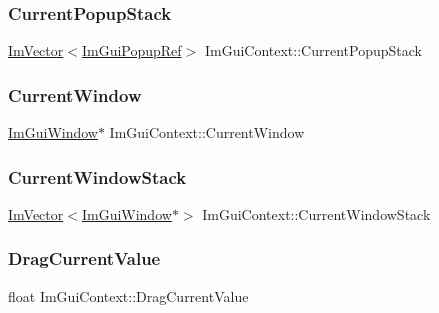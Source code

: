 \hypertarget{struct_im_gui_context_a7b2472ca52bcccb98e0db1a8b1b78853}{}\label{struct_im_gui_context_a7b2472ca52bcccb98e0db1a8b1b78853} 
\subsubsection{\texorpdfstring{Current\+Popup\+Stack}{CurrentPopupStack}}
{\footnotesize\ttfamily \hyperlink{class_im_vector}{Im\+Vector}$<$\hyperlink{struct_im_gui_popup_ref}{Im\+Gui\+Popup\+Ref}$>$ Im\+Gui\+Context\+::\+Current\+Popup\+Stack}

\hypertarget{struct_im_gui_context_aa923044f396241668aef5ed2f4c4d847}{}\label{struct_im_gui_context_aa923044f396241668aef5ed2f4c4d847} 
\subsubsection{\texorpdfstring{Current\+Window}{CurrentWindow}}
{\footnotesize\ttfamily \hyperlink{struct_im_gui_window}{Im\+Gui\+Window}$\ast$ Im\+Gui\+Context\+::\+Current\+Window}

\hypertarget{struct_im_gui_context_a19020a20e7bca2fadbb287106b92891b}{}\label{struct_im_gui_context_a19020a20e7bca2fadbb287106b92891b} 
\subsubsection{\texorpdfstring{Current\+Window\+Stack}{CurrentWindowStack}}
{\footnotesize\ttfamily \hyperlink{class_im_vector}{Im\+Vector}$<$\hyperlink{struct_im_gui_window}{Im\+Gui\+Window}$\ast$$>$ Im\+Gui\+Context\+::\+Current\+Window\+Stack}

\hypertarget{struct_im_gui_context_a96ed5993aaddb183dc36244912ea261f}{}\label{struct_im_gui_context_a96ed5993aaddb183dc36244912ea261f} 
\subsubsection{\texorpdfstring{Drag\+Current\+Value}{DragCurrentValue}}
{\footnotesize\ttfamily float Im\+Gui\+Context\+::\+Drag\+Current\+Value}

